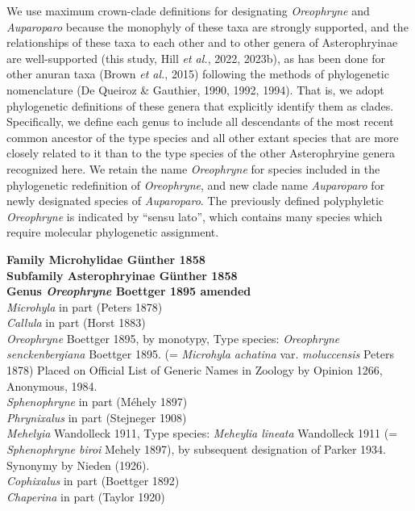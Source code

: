\documentclass[
  letterpaper,
  DIV=11,
  numbers=noendperiod]{scrartcl}
\begin{document}
We use maximum crown-clade definitions for designating \emph{Oreophryne}
and \emph{Auparoparo} because the monophyly of these taxa are strongly
supported, and the relationships of these taxa to each other and to
other genera of Asterophryinae are well-supported (this study, Hill
\emph{et al.}, 2022, 2023b), as has been done for other anuran taxa
(Brown \emph{et al.}, 2015) following the methods of phylogenetic
nomenclature (De Queiroz \& Gauthier, 1990, 1992, 1994). That is, we
adopt phylogenetic definitions of these genera that explicitly identify
them as clades. Specifically, we define each genus to include all
descendants of the most recent common ancestor of the type species and
all other extant species that are more closely related to it than to the
type species of the other Asterophryine genera recognized here. We
retain the name \emph{Oreophryne} for species included in the
phylogenetic redefinition of \emph{Oreophryne}, and new clade name
\emph{Auparoparo} for newly designated species of \emph{Auparoparo}. The
previously defined polyphyletic \emph{Oreophryne} is indicated by
``sensu lato'', which contains many species which require molecular
phylogenetic assignment.

\textbf{Family Microhylidae Günther 1858}\\
\textbf{Subfamily Asterophryinae Günther 1858}\\
\textbf{Genus \emph{Oreophryne} Boettger 1895 amended}\\
\emph{Microhyla} in part (Peters 1878)\\
\emph{Callula} in part (Horst 1883)\\
\emph{Oreophryne} Boettger 1895, by monotypy, Type species:
\emph{Oreophryne senckenbergiana} Boettger 1895. (= \emph{Microhyla
achatina} var. \emph{moluccensis} Peters 1878) Placed on Official List
of Generic Names in Zoology by Opinion 1266, Anonymous, 1984.\\
\emph{Sphenophryne} in part (Méhely 1897)\\
\emph{Phrynixalus} in part (Stejneger 1908)\\
\emph{Mehelyia} Wandolleck 1911, Type species: \emph{Meheylia lineata}
Wandolleck 1911 (= \emph{Sphenophryne biroi} Mehely 1897), by subsequent
designation of Parker 1934. Synonymy by Nieden (1926).\\
\emph{Cophixalus} in part (Boettger 1892)\\
\emph{Chaperina} in part (Taylor 1920)
\end{document}
